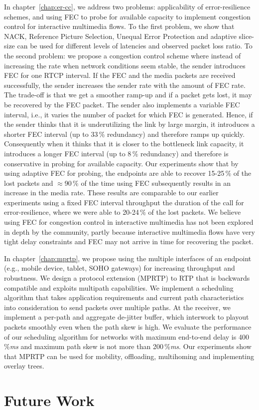 In chapter~\ref{chap:er-cc}, we address two problems: applicability of
error-resilience schemes, and using FEC to probe for available capacity to
implement congestion control for interactive multimedia flows. To the first
problem, we show that NACK, Reference Picture Selection, Unequal Error
Protection and adaptive slice-size can be used for different levels of
latencies and observed packet loss ratio. To the second problem: we propose a
congestion control scheme where instead of increasing the rate when network
conditions seem stable, the sender introduces FEC for one RTCP interval. If
the FEC and the media packets are received successfully, the sender increases
the sender rate with the amount of FEC rate. The trade-off is that we get a
smoother ramp-up and if a packet gets lost, it may be recovered by the FEC
packet. The sender also implements a variable FEC interval, i.e., it varies
the number of packet for which FEC is generated. Hence, if the sender thinks
that it is underutilizing the link by large margin, it introduces a shorter
FEC interval (up to 33\,\% redundancy) and therefore ramps up quickly.
Consequently when it thinks that it is closer to the bottleneck link capacity,
it introduces a longer FEC interval (up to 8\,\% redundancy) and therefore is
conservative in probing for available capacity. Our experiments show that by
using adaptive FEC for probing, the endpoints are able to recover 15-25\,\% of
the lost packets and $\approx$90\,\% of the time using FEC subsequently
results in an increase in the media rate. These results are comparable to our
earlier experiments using a fixed FEC interval throughput the duration of the
call for error-resilience, where we were able to 20-24\,\% of the lost
packets. We believe using FEC for congestion control in interactive multimedia
has not been explored in depth by the community, partly because interactive
multimedia flows have very tight delay constraints and FEC may not arrive in
time for recovering the packet.

In chapter~\ref{chap:mprtp}, we propose using the multiple interfaces of an
endpoint (e.g., mobile device, tablet, SOHO gateways) for increasing
throughput and robustness. We design a protocol extension (MPRTP) to RTP that
is backwards compatible and exploits multipath capabilities. We implement a
scheduling algorithm that takes application requirements and current path
characteristics into consideration to send packets over multiple paths. At the
receiver, we implement a per-path and aggregate de-jitter buffer, which
interwork to playout packets smoothly even when the path skew is high. We
evaluate the performance of our scheduling algorithm for networks with maximum
end-to-end delay is 400\,\%\emph{ms} and maximum path skew is not more than
200\,\%\emph{ms}. Our experiments show that MPRTP can be used for mobility,
offloading, multihoming and implementing overlay trees.



\section{Future Work}
